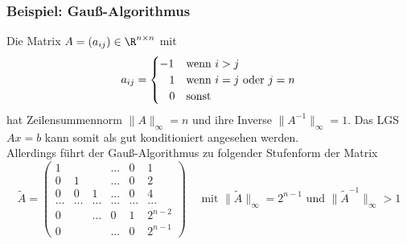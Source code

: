 \begin{frame}\frametitle{Beispiel: Gauß-Algorithmus}
Die Matrix $A=(a_{ij}) \in \R^{n \times n} $ mit
$$
a_{ij}=\begin{cases} -1 & \text{wenn } i>j \\ \hspace{3mm} 1 & \text{wenn } i= j \text{ oder } j=n \\\hspace{3mm} 0 & \text{sonst} \end{cases}
$$
hat Zeilensummennorm $\|A\|_\infty =n$ und ihre Inverse $\|A^{-1}\|_\infty =1$. Das LGS $Ax=b$ kann somit als gut konditioniert angesehen werden.\\
Allerdings führt der Gauß-Algorithmus zu folgender Stufenform der Matrix 
\small
$$
\tilde A= \begin{pmatrix} 1 &&&...&0&1 \\ 0&1&&...&0&2 \\ 0&0&1&...&0&4 \\ ...&...&...&...&...&...\\ 0&&...&0&1&2^{n-2} \\ 0&&&...&0&2^{n-1} \end{pmatrix} \quad \text{ mit } \|\tilde A\|_\infty = 2^{n-1} \text{ und } \|\tilde A^{-1}\|_\infty >1
$$

\end{frame}
%
